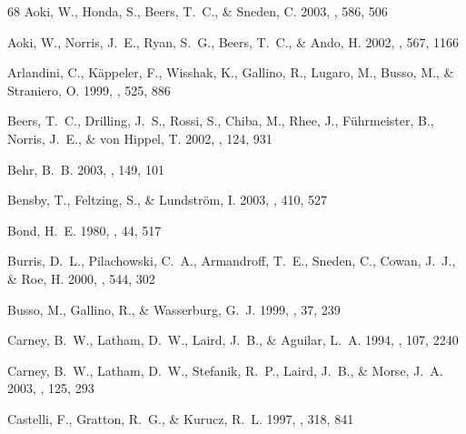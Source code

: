 \documentclass[12pt,preprint]{aastex}
\begin{document}
{\begin{thebibliography}{68}
{Aoki}, W., {Honda}, S., {Beers}, T.~C., \& {Sneden}, C. 2003, \apj, 586, 506

{Aoki}, W., {Norris}, J.~E., {Ryan}, S.~G., {Beers}, T.~C., \& {Ando}, H. 2002,
  \apj, 567, 1166

{Arlandini}, C., {K{\" a}ppeler}, F., {Wisshak}, K., {Gallino}, R., {Lugaro},
  M., {Busso}, M., \& {Straniero}, O. 1999, \apj, 525, 886

{Beers}, T.~C., {Drilling}, J.~S., {Rossi}, S., {Chiba}, M., {Rhee}, J., {F{\"
  u}hrmeister}, B., {Norris}, J.~E., \& {von Hippel}, T. 2002, \aj, 124, 931

{Behr}, B.~B. 2003, \apjs, 149, 101

{Bensby}, T., {Feltzing}, S., \& {Lundstr{\" o}m}, I. 2003, \aap, 410, 527

{Bond}, H.~E. 1980, \apjs, 44, 517

{Burris}, D.~L., {Pilachowski}, C.~A., {Armandroff}, T.~E., {Sneden}, C.,
  {Cowan}, J.~J., \& {Roe}, H. 2000, \apj, 544, 302

{Busso}, M., {Gallino}, R., \& {Wasserburg}, G.~J. 1999, \araa, 37, 239

{Carney}, B.~W., {Latham}, D.~W., {Laird}, J.~B., \& {Aguilar}, L.~A. 1994,
  \aj, 107, 2240

{Carney}, B.~W., {Latham}, D.~W., {Stefanik}, R.~P., {Laird}, J.~B., \&
  {Morse}, J.~A. 2003, \aj, 125, 293

{Castelli}, F., {Gratton}, R.~G., \& {Kurucz}, R.~L. 1997, \aap, 318, 841


\end{thebibliography}}
\end{document}
